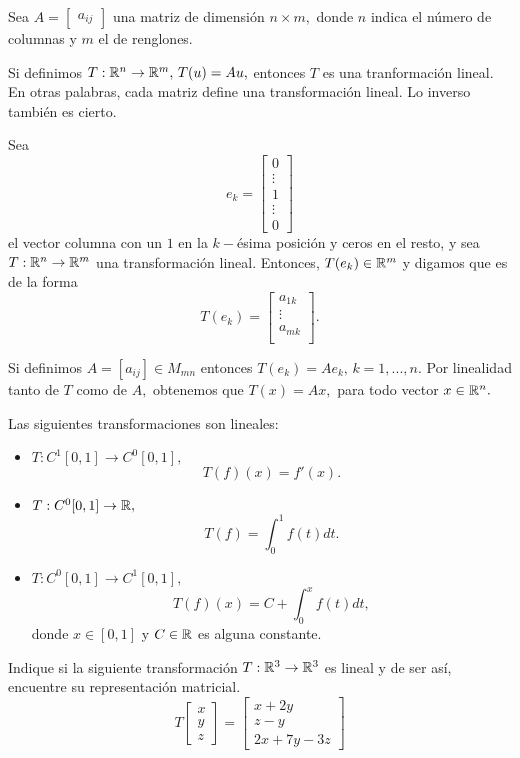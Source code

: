 \begin{problema}
\label{matriz:trans_lin}
Sea $A=\begin{bmatrix}
        a_{ij}
       \end{bmatrix}
$ una matriz de dimensi\'on $n \times m,$ donde $n$ indica el número  de columnas y $m$ el de renglones.

Si definimos $T:\mathbb{R}^{n}\to \mathbb{R}^{m}, \, T(u)=Au,$ entonces $T$ es una tranformaci\'on lineal. En otras palabras, cada
matriz define una transformaci\'on lineal. Lo inverso tambi\'en es cierto.

Sea $$e_{k}=\begin{bmatrix}
             0\\
             \vdots \\
             1 \\
             \vdots \\
             0             
            \end{bmatrix}
$$
el vector columna con un $1$ en la $k-$\'esima posici\'on y ceros en el resto, y sea $T:\mathbb{R}^{n}\to \mathbb{R}^{m}$ una
transformaci\'on lineal. Entonces, $T(e_{k})\in \mathbb{R}^{m}$ y digamos que es de la forma
$$
T(e_{k})=\begin{bmatrix}
          a_{1k}\\
          \vdots \\     
          a_{mk} \\
         \end{bmatrix}.
$$

Si definimos $A=[a_{ij}]\in M_{mn}$ entonces $T(e_{k})=Ae_{k}, \, k=1,...,n.$ Por linealidad tanto de $T$ como de $A,$
obtenemos que $T(x)=Ax,$ para todo vector $x\in \mathbb{R}^{n}.$
\end{problema}

\begin{problema}
Las siguientes transformaciones son lineales:
\begin{itemize}
 \item $T:C^{1}[0,1]\to C^{0}[0,1],$
 $$
T(f)(x)=f'(x).
 $$
 \item $T:C^{0}[0,1]\to \mathbb{R},$
$$
T(f)=\int_{0}^{1}f(t)dt.
$$
\item $T:C^{0}[0,1]\to C^{1}[0,1],$
$$
T(f)(x)=C+\int_{0}^{x}f(t)dt, 
$$
donde $x\in[0,1]$ y $C\in \mathbb{R}$ es alguna constante.
\end{itemize}

\end{problema}

\begin{problema}
 Indique si la siguiente transformaci\'on $T:\mathbb{R}^{3}\to \mathbb{R}^{3}$ es lineal y de ser as\'i, encuentre su representaci\'on
matricial.
\[
\label{trans_exmp}
 T\begin{bmatrix}
    x\\y\\z
   \end{bmatrix}=
   \begin{bmatrix}
    x+2y \\ z-y\\ 2x+7y-3z
   \end{bmatrix}
\]

\end{problema}


